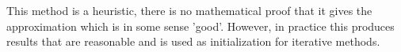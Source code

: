 This method is a heuristic, there is no mathematical proof that it gives
the approximation which is in some sense 'good'. However, in practice this produces
results that are reasonable and is used as initialization for iterative methods.








